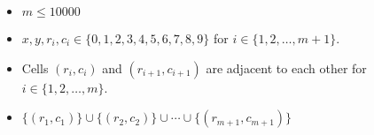 \begin{itemize}
\tightlist
\item $m\le 10000$
\item $x,y,r_i,c_i\in\{0,1,2,3,4,5,6,7,8,9\}$ for $i\in\{1,2,\ldots,m+1\}$. 
\item Cells $(r_i,c_i)$ and $(r_{i+1},c_{i+1})$ are adjacent to each other 
      for $i\in\{1,2,\ldots,m\}$.
\item $\{(r_1,c_1)\}\cup\{(r_2,c_2)\}\cup\cdots\cup\{(r_{m+1},c_{m+1})\}$
\end{itemize}
\newpage
